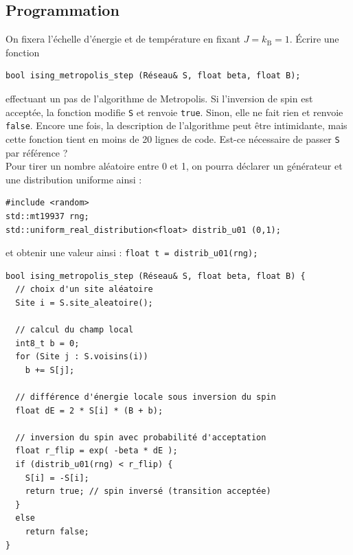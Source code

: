 \documentclass{book}
\newcommand{\inline}[1]{\texttt{#1}}
\begin{document}
\subsection{Programmation}

On fixera l'échelle d'énergie et de température en fixant $J=k_\mathrm{B}=1$. Écrire une fonction
\begin{verbatim}
bool ising_metropolis_step (Réseau& S, float beta, float B);
\end{verbatim}
effectuant un pas de l'algorithme de Metropolis. Si l'inversion de spin est acceptée, la fonction modifie \inline{S} et renvoie \inline{true}. Sinon, elle ne fait rien et renvoie \inline{false}. Encore une fois, la description de l'algorithme peut être intimidante, mais cette fonction tient en moins de 20 lignes de code. Est-ce nécessaire de passer \inline{S} par référence ?\\

Pour tirer un nombre aléatoire entre 0 et 1, on pourra déclarer un générateur et une distribution uniforme ainsi :
\begin{verbatim}
#include <random>
std::mt19937 rng;
std::uniform_real_distribution<float> distrib_u01 (0,1);
\end{verbatim}
et obtenir une valeur ainsi : \inline{float t = distrib_u01(rng);}\\

\begin{correction}
\begin{verbatim}
bool ising_metropolis_step (Réseau& S, float beta, float B) {
  // choix d'un site aléatoire
  Site i = S.site_aleatoire();

  // calcul du champ local
  int8_t b = 0;
  for (Site j : S.voisins(i))
    b += S[j];

  // différence d'énergie locale sous inversion du spin
  float dE = 2 * S[i] * (B + b);

  // inversion du spin avec probabilité d'acceptation
  float r_flip = exp( -beta * dE );
  if (distrib_u01(rng) < r_flip) {
    S[i] = -S[i];
    return true; // spin inversé (transition acceptée)
  }
  else
    return false;
}
\end{verbatim}

\end{correction}
\end{document}
